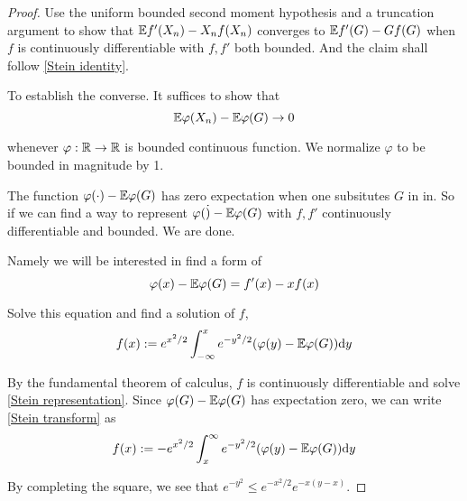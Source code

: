 \begin{proof}
    Use the uniform bounded second moment hypothesis and a truncation argument to show that $\mathbb{E} f'(X_n)-X_n f(X_n)$ converges to $\mathbb{E} f'(G)-Gf(G)$ when $f$ is continuously differentiable with $f,f'$ both bounded. And the claim shall follow \ref{Stein identity}. 

    To establish the converse. It suffices to show that 
    \begin{equation*}
        \mathbb{E} \varphi(X_n) -\mathbb{E} \varphi(G) \to 0
    \end{equation*}

    whenever $\varphi : \mathbb{R} \to \mathbb{R}$ is bounded continuous function. We normalize $\varphi$ to be bounded in magnitude by 1. 
    
    The function $\varphi (\cdot)-\mathbb{E} \varphi(G)$ has zero expectation when one subsitutes $G$ in in. So if we can find a way to represent $\varphi (\dot)-\mathbb{E} \varphi(G)$ with $f,f'$ continuously differentiable and bounded. We are done.

    Namely we will be interested in find a form of 
    \begin{equation}\label{Stein representation}
        \varphi(x)-\mathbb{E} \varphi(G) = f'(x)-xf(x)
    \end{equation}

    Solve this equation and find a solution of $f$, 
    \begin{equation}\label{Stein transform}
        f(x) := e^{x^2/2} \int^x_{-\infty}e^{-y^2/2}(\varphi(y)-\mathbb{E} \varphi(G))\mathrm{d} y
    \end{equation}

    By the fundamental theorem of calculus, $f$ is continuously differentiable and solve \ref{Stein representation}. Since $\varphi (G)-\mathbb{E} \varphi(G)$ has expectation zero, we can write \ref{Stein transform} as 
    \begin{equation}
        f(x):= -e^{x^2/2} \int^\infty_{x}e^{-y^2/2}(\varphi(y)-\mathbb{E} \varphi(G))\mathrm{d} y
    \end{equation}

    By completing the square, we see that $e^{-y^2} \leq e^{-x^2/2}e^{-x(y-x)}$. 


\end{proof}
